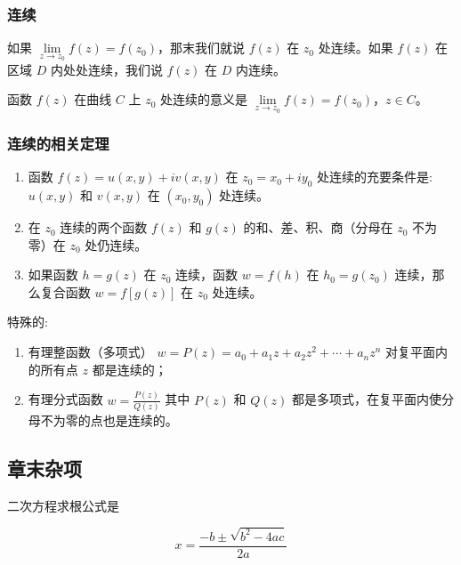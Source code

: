 \subsubsection{连续}
\label{连续}
如果 \(\lim\limits_{z \to z_0} f(z) = f(z_0)\)，那末我们就说 \(f(z)\) 在
\(z_0\) 处连续。如果 \(f(z)\) 在区域 \(D\) 内处处连续，我们说 \(f(z)\)
在 \(D\) 内连续。

函数 \(f(z)\) 在曲线 \(C\) 上 \(z_0\) 处连续的意义是
\(\lim\limits_{z \to z_0} f(z) = f(z_0)\)，\(z \in C\)。
\subsubsection{连续的相关定理}
\label{连续的相关定理}
\begin{enumerate}
\item 函数 \(f(z) = u(x, y) + iv(x, y)\) 在 \(z_0 = x_0 + iy_0\)
处连续的充要条件是: \(u(x, y)\) 和 \(v(x, y)\) 在 \((x_0, y_0)\)
处连续。
\item 在 \(z_0\) 连续的两个函数 \(f(z)\) 和 \(g(z)\)
的和、差、积、商（分母在 \(z_0\) 不为零）在 \(z_0\) 处仍连续。
\item 如果函数 \(h = g(z)\) 在 \(z_0\) 连续，函数 \(w = f(h)\) 在
\(h_0 = g(z_0)\) 连续，那么复合函数 \(w = f[g(z)]\) 在 \(z_0\)
处连续。
\end{enumerate}

\begin{tcolorbox}[title={Note},colback=red!5!white
,colframe=red!75!black
,colbacktitle=yellow!50!red
,coltitle=red!25!black, fonttitle=\bfseries,subtitle style={boxrule=0.4pt, colback=yellow!50!red!25!white}]
特殊的:
\begin{enumerate}
\item 有理整函数（多项式） \(w=P(z)=a_{0}+a_{1}z+a_{2}z^{2}+\cdots+a_{n}z^{n}\) 对复平面内的所有点 \(z\) 都是连续的；
\item 有理分式函数 \(w=\frac{P(z)}{Q(z)}\) 其中 \(P(z)\) 和 \(Q(z)\) 都是多项式，在复平面内使分母不为零的点也是连续的。
\end{enumerate}

\end{tcolorbox}
\subsection{章末杂项}
\label{章末杂项}
二次方程求根公式是

\begin{equation*}
x=\frac{-b \pm \sqrt{b^2-4ac}}{2a}
\end{equation*}

